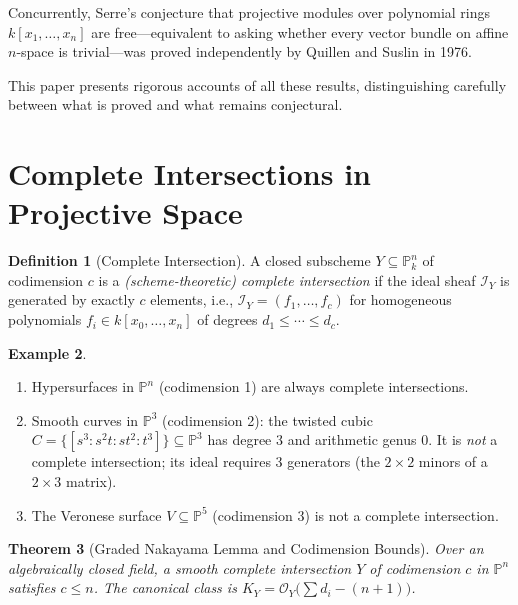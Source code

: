 \documentclass[12pt,a4paper]{amsart}
\newtheorem{theorem}{Theorem}[section]
\theoremstyle{definition}
\newtheorem{definition}[theorem]{Definition}
\newtheorem{example}[theorem]{Example}
\theoremstyle{remark}
\newcommand{\PP}{\mathbb{P}}
\newcommand{\OO}{\mathcal{O}}
\begin{document}
Concurrently, Serre's conjecture that projective modules over polynomial rings
$k[x_1,\ldots,x_n]$ are free---equivalent to asking whether every vector
bundle on affine $n$-space is trivial---was proved independently by Quillen
\cite{Quillen1976} and Suslin \cite{Suslin1976} in 1976.

This paper presents rigorous accounts of all these results, distinguishing
carefully between what is proved and what remains conjectural.

\section{Complete Intersections in Projective Space}

\begin{definition}[Complete Intersection]
A closed subscheme $Y \subseteq \PP^n_k$ of codimension $c$ is a
\emph{(scheme-theoretic) complete intersection} if the ideal sheaf
$\mathcal{I}_Y$ is generated by exactly $c$ elements, i.e.,
$\mathcal{I}_Y = (f_1,\ldots,f_c)$ for homogeneous polynomials
$f_i \in k[x_0,\ldots,x_n]$ of degrees $d_1 \le \cdots \le d_c$.
\end{definition}

\begin{example}
\begin{enumerate}[label=(\roman*)]
  \item Hypersurfaces in $\PP^n$ (codimension 1) are always complete
        intersections.
  \item Smooth curves in $\PP^3$ (codimension 2): the twisted cubic
        $C = \{[s^3:s^2t:st^2:t^3]\} \subseteq \PP^3$ has degree 3 and
        arithmetic genus 0.  It is \emph{not} a complete intersection;
        its ideal requires 3 generators (the $2\times 2$ minors of a
        $2\times 3$ matrix).
  \item The Veronese surface $V \subseteq \PP^5$ (codimension 3) is not a
        complete intersection.
\end{enumerate}
\end{example}

\begin{theorem}[Graded Nakayama Lemma and Codimension Bounds]
Over an algebraically closed field, a smooth complete intersection $Y$ of
codimension $c$ in $\PP^n$ satisfies $c \le n$.  The canonical class is
$K_Y = \OO_Y\!\bigl(\sum d_i - (n+1)\bigr)$.
\end{theorem}
\end{document}

